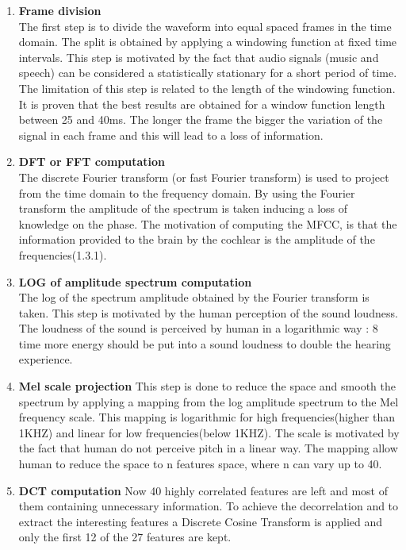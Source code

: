 \documentclass[hidelinks,12pt]{report}
\begin{document}
\begin{enumerate}
\item \textbf{Frame division} \\
The first step is to divide the waveform into equal spaced frames in the time domain. The split is obtained by applying a windowing function at fixed time intervals. This step is motivated by the fact that audio signals (music and speech) can be considered a statistically stationary for a short period of time. The limitation of this step is related to the length of the windowing function. It is proven that the best results are obtained for a window function length between 25 and 40ms. The longer the frame the bigger the variation of the signal in each frame and this will lead to a loss of information. 

\item \textbf{DFT or FFT computation\\}
The discrete Fourier transform (or fast Fourier transform) is used to project from the time domain to the frequency domain. By using the Fourier transform the amplitude of the spectrum is taken inducing a loss of knowledge on the phase. The motivation of computing the MFCC, is that the information provided to the brain by the cochlear is the amplitude of the frequencies(1.3.1).
\item \textbf{LOG of amplitude spectrum computation}\\
The log of the spectrum amplitude obtained by the Fourier transform is taken. This step is motivated by the human perception of the sound loudness. The loudness of the sound is perceived by human in a logarithmic way : 8 time more energy should be put into a sound loudness to double the hearing experience. 
\item \textbf{Mel scale projection}
This step is done to reduce the space and smooth the spectrum by applying a mapping from the log amplitude spectrum to the Mel frequency scale. This mapping is logarithmic for high frequencies(higher than 1KHZ) and linear for low frequencies(below 1KHZ). The scale is motivated by the fact that human do not perceive pitch in a linear way. The mapping allow human to reduce the space to n features space, where n can vary up to 40.
\item \textbf{DCT computation}
Now 40 highly correlated features are left and most of them containing unnecessary information. To achieve the decorrelation and to extract the interesting features a Discrete Cosine Transform is applied and only the first 12 of the 27 features are kept. 
\end{enumerate}
\end{document}
